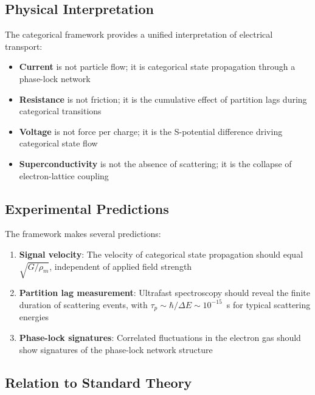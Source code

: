 \documentclass[twocolumn,showpacs,preprintnumbers,amsmath,amssymb,prd]{revtex4-2}
\newcommand{\taup}{\tau_p}
\begin{document}
\subsection{Physical Interpretation}

The categorical framework provides a unified interpretation of electrical transport:

\begin{itemize}
\item \textbf{Current} is not particle flow; it is categorical state propagation through a phase-lock network

\item \textbf{Resistance} is not friction; it is the cumulative effect of partition lags during categorical transitions

\item \textbf{Voltage} is not force per charge; it is the S-potential difference driving categorical state flow

\item \textbf{Superconductivity} is not the absence of scattering; it is the collapse of electron-lattice coupling
\end{itemize}

\subsection{Experimental Predictions}

The framework makes several predictions:

\begin{enumerate}
\item \textbf{Signal velocity}: The velocity of categorical state propagation should equal $\sqrt{G/\rho_m}$, independent of applied field strength

\item \textbf{Partition lag measurement}: Ultrafast spectroscopy should reveal the finite duration of scattering events, with $\taup \sim \hbar/\Delta E \sim 10^{-15}$~s for typical scattering energies

\item \textbf{Phase-lock signatures}: Correlated fluctuations in the electron gas should show signatures of the phase-lock network structure
\end{enumerate}

\subsection{Relation to Standard Theory}
\end{document}
